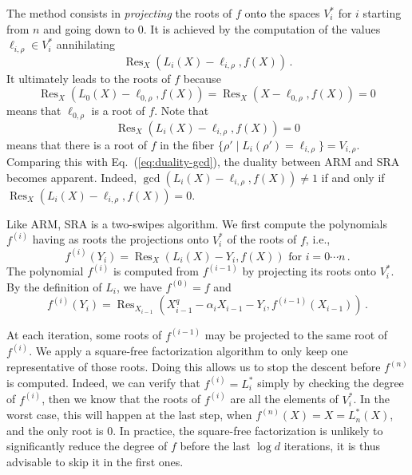 \documentclass{sig-alternate}
\newcommand{\dd}{d}
\DeclareMathOperator{\Res}{Res}
\newcounter{algo}
\renewcommand{\paragraph}[1]{\smallskip\noindent{{\bf \rm #1.}}}
\begin{document}
\paragraph{SRA} The method consists in \emph{projecting} the roots of $f$ onto the spaces $V_i^\ast$ for $i$ starting from $n$ and going down to 0.
It is achieved by the computation of the values $\ell_{i,\rho} \in V_i^\ast$ annihilating
 \begin{equation}
 \label{base_SRA}
\Res_X(L_i(X)-\ell_{i,\rho},f(X)) \,.
\end{equation}
It ultimately leads to the roots of $f$ because
$$\Res_X(L_0(X)-\ell_{0,\rho},f(X))=\Res_X(X-\ell_{0,\rho},f(X))=0\,$$
means that $\ell_{0,\rho}$ is a root of $f$. Note that 
\begin{equation}
  \label{eq:duality-res}
  \Res_X(L_i(X)-\ell_{i,\rho},f(X)) =0
\end{equation}
means that there is a root of $f$ in the fiber $\{\rho' \mid
L_i(\rho')=\ell_{i,\rho} \}=V_{i,\rho}$.  Comparing this with
Eq.~(\ref{eq:duality-gcd}), the duality between ARM and SRA becomes
apparent. Indeed, $\gcd(L_i(X)-\ell_{i,\rho},f(X)) \ne 1$ if and only
if $\Res_X(L_i(X)-\ell_{i,\rho},f(X)) =0$.

Like ARM, SRA is a two-swipes algorithm.  We first compute the
polynomials $f^{(i)}$ having as roots the projections onto $V_i^\ast$
of the roots of $f$, i.e.,
\begin{equation}
\label{original_resultant}
f^{(i)}(Y_i)=\Res_{X}(L_i(X)-Y_i,f(X))  \mbox{ for }i=0 \cdots n \,.
\end{equation}
The polynomial $f^{(i)}$ is computed from $f^{(i-1)}$ by projecting
its roots onto $V_i^\ast$. By the definition of $L_i$, we have  $f ^{(0)}=f$ and
$$f^{(i)}(Y_i)=\Res_{X_{i-1}}(X^q_{i-1} - \alpha_i X_{i-1} -Y_i,f^{(i-1)}(X_{i-1})) \,.$$

At each iteration, some roots of $f^{(i-1)}$ may be projected to the
same root of $f^{(i)}$. We apply a square-free factorization algorithm
to only keep one representative of those roots. Doing this allows us
to stop the descent before $f^{(n)}$ is computed. Indeed, we can
verify that $f^{(i)}=L_i^\ast$ simply by checking the degree of
$f^{(i)}$, then we know that the roots of $f^{(i)}$ are all the
elements of $V_i^\ast$. In the worst case, this will happen at the
last step, when $f^{(n)}(X)=X=L_n^\ast(X)$, and the only root is $0$.
In practice, the square-free factorization is unlikely to
significantly reduce the degree of $f$ before the last $\log\dd$
iterations, it is thus advisable to skip it in the first ones.
\end{document}
